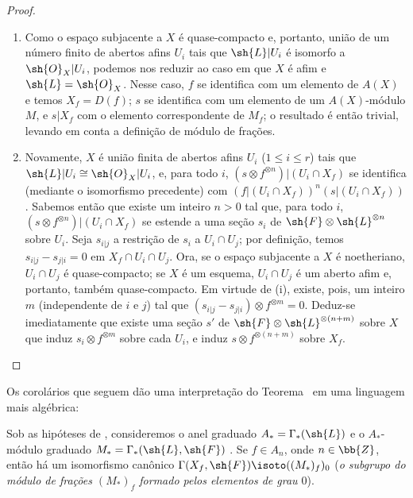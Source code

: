 \documentclass[oneside]{amsart}
\renewcommand{\leq}{\leqslant}
\newcommand{\oldpage}[2][]{{\marginnote{\normalfont\textbf{#1}~|~#2}}\ignorespaces}
\let\EGAOriginalLabel\label
\renewcommand{\label}[1]{\phantomsection\EGAOriginalLabel{#1}}
\begin{document}
\begin{proof}
\medskip\noindent
\begin{enumerate}
  \item[(i)] Como o espaço subjacente a $X$ é quase-compacto e, portanto, união de
    um número finito de abertos afins $U_i$ tais que $\sh{L}|U_i$ é isomorfo a
    $\sh{O}_X|U_i$, podemos nos reduzir ao caso em que $X$ é afim e $\sh{L}=\sh{O}_X$.
    Nesse caso, $f$ se identifica com um elemento de $A(X)$ e temos
    $X_f=D(f)$; $s$ se identifica com um elemento de um $A(X)$-módulo $M$, e
    $s|X_f$ com o elemento correspondente de $M_f$; o resultado é então trivial,
    levando em conta a definição de módulo de frações.
\oldpage[I]{173}
  \item[(ii)] Novamente, $X$ é união finita de abertos afins $U_i$ ($1\leq i\leq r$)
    tais que $\sh{L}|U_i\cong\sh{O}_X|U_i$, e, para todo $i$,
    $(s\otimes f^{\otimes n})|(U_i\cap X_f)$ se identifica (mediante o isomorfismo
    precedente) com $(f|(U_i\cap X_f))^n(s|(U_i\cap X_f))$. Sabemos então
     que existe um inteiro $n>0$ tal que, para todo
    $i$, $(s\otimes f^{\otimes n})|(U_i\cap X_f)$ se estende a uma seção $s_i$ de
    $\sh{F}\otimes\sh{L}^{\otimes n}$ sobre $U_i$. Seja $s_{i|j}$ a restrição
    de $s_i$ a $U_i\cap U_j$; por definição, temos $s_{i|j}-s_{j|i}=0$ em
    $X_f\cap U_i\cap U_j$. Ora, se o espaço subjacente a $X$ é noetheriano, $U_i\cap U_j$ é
    quase-compacto; se $X$ é um esquema, $U_i\cap U_j$ é um aberto afim
     e, portanto, também quase-compacto. Em virtude de (i), existe, pois,
    um inteiro $m$ (independente de $i$ e $j$) tal que
    $(s_{i|j}-s_{j|i})\otimes f^{\otimes m}=0$. Deduz-se imediatamente que
    existe uma seção $s'$ de $\sh{F}\otimes\sh{L}^{\otimes(n+m)}$ sobre $X$ que
    induz $s_i\otimes f^{\otimes m}$ sobre cada $U_i$, e induz
    $s\otimes f^{\otimes(n+m)}$ sobre $X_f$.
\end{enumerate}
\end{proof}

Os corolários que seguem dão uma interpretação do Teorema~ em uma linguagem
mais algébrica:
\begin{corollary}[9.3.2]
\label{I.9.3.2}
Sob as hipóteses de , consideremos o anel graduado $A_*=\Gamma_*(\sh{L})$
e o $A_*$-módulo graduado $M_*=\Gamma_*(\sh{L},\sh{F})$ . Se $f\in A_n$,
onde $n\in\bb{Z}$, então há um isomorfismo canônico
$\Gamma(X_f,\sh{F})\isoto((M_*)_f)_0$ (\emph{o subgrupo do módulo de frações
$(M_*)_f$ formado pelos elementos de grau $0$}).
\end{corollary}
\end{document}
